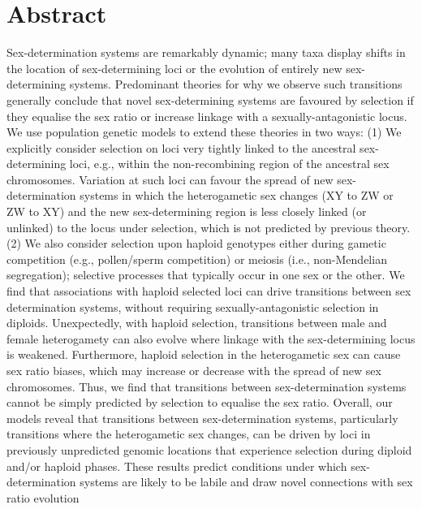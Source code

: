 \documentclass[10pt,letterpaper]{article}
\begin{document}
\section*{Abstract}
Sex-determination systems are remarkably dynamic; many taxa display shifts in the location of sex-determining loci or the evolution of entirely new sex-determining systems. 
Predominant theories for why we observe such transitions generally conclude that novel sex-determining systems are favoured by selection if they equalise the sex ratio or increase linkage with a sexually-antagonistic locus. 
We use population genetic models to extend these theories in two ways: 
(1) We explicitly consider selection on loci very tightly linked to the ancestral sex-determining loci, e.g., within the non-recombining region of the ancestral sex chromosomes. 
Variation at such loci can favour the spread of new sex-determination systems in which the heterogametic sex changes (XY to ZW or ZW to XY) and the new sex-determining region is less closely linked (or unlinked) to the locus under selection, which is not predicted by previous theory. 
(2) We also consider selection upon haploid genotypes either during gametic competition (e.g., pollen/sperm competition) or meiosis (i.e., non-Mendelian segregation); selective processes that typically occur in one sex or the other. 
We find that associations with haploid selected loci can drive transitions between sex determination systems, without requiring sexually-antagonistic selection in diploids. 
Unexpectedly, with haploid selection, transitions between male and female heterogamety can also evolve where linkage with the sex-determining locus is weakened. 
Furthermore, haploid selection in the heterogametic sex can cause sex ratio biases, which may increase or decrease with the spread of new sex chromosomes. 
Thus, we find that transitions between sex-determination systems cannot be simply predicted by selection to equalise the sex ratio. 
Overall, our models reveal that transitions between sex-determination systems, particularly transitions where the heterogametic sex changes, can be driven by loci in previously unpredicted genomic locations that experience selection during diploid and/or haploid phases.
These results predict conditions under which sex-determination systems are likely to be labile and draw novel connections with sex ratio evolution


\end{document}
